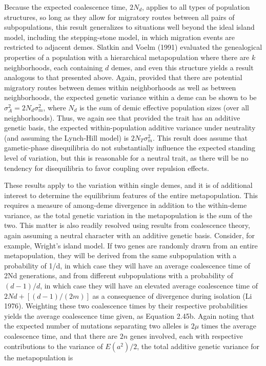 \documentclass{article}
\begin{document}
Because the expected coalescence time,  $ 2N_d $, applies to all types of population structures, so long as they allow for migratory routes between all pairs of subpopulations, this result generalizes to situations well beyond the ideal island model, including the stepping-stone model, in which migration events are restricted to adjacent demes. Slatkin and Voelm (1991) evaluated the genealogical properties of a population with a hierarchical metapopulation where there are  $ k $ neighborhoods, each containing  $ d $ demes, and even this structure yields a result analogous to that presented above. Again, provided that there are potential migratory routes between demes within neighborhoods as well as between neighborhoods, the expected genetic variance within a deme can be shown to be  $ \sigma_A^2 = 2N_d \sigma_m^2 $, where  $ N_d $ is the sum of demic effective population sizes (over all neighborhoods). Thus, we again see that provided the trait has an additive genetic basis, the expected within-population additive variance under neutrality (and assuming the Lynch-Hill model) is  $ 2N_T \sigma_m^2 $. This result does assume that gametic-phase disequilibria do not substantially influence the expected standing level of variation, but this is reasonable for a neutral trait, as there will be no tendency for disequilibria to favor coupling over repulsion effects.

These results apply to the variation within single demes, and it is of additional interest to determine the equilibrium features of the entire metapopulation. This requires a measure of among-deme divergence in addition to the within-deme variance, as the total genetic variation in the metapopulation is the sum of the two. This matter is also readily resolved using results from coalescence theory, again assuming a neutral character with an additive genetic basis. Consider, for example, Wright's island model. If two genes are randomly drawn from an entire metapopulation, they will be derived from the same subpopulation with a probability of 1/d, in which case they will have an average coalescence time of 2Nd generations, and from different subpopulations with a probability of  $ (d-1)/d $, in which case they will have an elevated average coalescence time of  $ 2Nd+[(d-1)/(2m)] $ as a consequence of divergence during isolation (Li 1976). Weighting these two coalescence times by their respective probabilities yields the average coalescence time given, as Equation 2.45b. Again noting that the expected number of mutations separating two alleles is  $ 2\mu $ times the average coalescence time, and that there are  $ 2n $ genes involved, each with respective contributions to the variance of  $ E(a^2)/2 $, the total additive genetic variance for the metapopulation is
\end{document}
